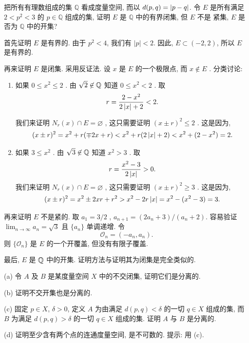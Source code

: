 \documentclass{article}
\begin{document}
\begin{problem}[2-16]
    把所有有理数组成的集 $\mathbb{Q}$ 看成度量空间, 而以 $d(p,q)=\left|p-q\right|$. 令 $E$ 是所有满足
    $2<p^2<3$ 的 $p\in\mathbb{Q}$ 组成的集, 证明 $E$ 是 $\mathbb{Q}$ 中的有界闭集, 但 $E$ 不是
    紧集, $E$ 是否为 $\mathbb{Q}$ 中的开集?
\end{problem}

\begin{solution}
    首先证明 $E$ 是有界的. 由于 $p^2 < 4$, 我们有 $|p| < 2$. 因此, $E \subset (-2, 2)$, 所以 $E$ 是有界的.\par
    再来证明 \( E \) 是闭集. 采用反证法. 设 \( x \) 是 \( E \) 的一个极限点, 而 \( x\not\in E \) . 分类讨论:
    \begin{enumerate}[label=(\alph*)]
        \item 如果 \( 0\le x^2\le 2 \) . 由 \( \sqrt{2}\not\in\mathbb{Q} \) 知道 \( 0\le x^2<2 \) . 取
        \[ r=\frac{2-x^2}{2\left|x\right|+2}<2. \] \par
        我们来证明 \( N_r(x)\cap E=\varnothing \) , 这只需要证明 \( (x\pm r)^2\le 2 \) . 这是因为, 
        \[ (x\pm r)^2=x^2+r(\mp2x+r)<x^2+r(2\left|x\right|+2)<x^2+(2-x^2)=2. \] 
        \item 如果 \( 3\le x^2 \) . 由 \( \sqrt{3}\not\in\mathbb{Q} \) 知道 \( x^2>3 \) . 取
        \[ r=\frac{x^2-3}{2\left|x\right|}>0. \] 
        我们来证明 \( N_r(x)\cap E=\varnothing \) , 这只需要证明 \( (x\pm r)^2\ge 3 \) . 这是因为,
        \[ (x\pm r)^2=x^2\pm 2xr+r^2>x^2-2r\left|x\right|=x^2-(x^2-3)=3. \] 
    \end{enumerate}\par
    再来证明 \( E \) 不是紧的. 取 \( a_1=3/2 \) , \( a_{n+1}=(2a_n+3)/(a_n+2) \). 容易验证 \( \lim_{n\to\infty}a_n=\sqrt{3} \) 且 \( \{a_n\} \) 单调递增. 令
    \[ \mathcal{O}_n=(-a_n,a_n). \] 
    则 \( \{\mathcal{O}_n\} \) 是 \( E \) 的一个开覆盖, 但没有有限子覆盖.\par
    最后, \( E \) 是 \( \mathbb{Q} \) 中的开集. 证明方法与证明其为闭集是完全类似的.
\end{solution}

\begin{problem}[2-19]
    (a) 令 $A$ 及 $B$ 是某度量空间 $X$ 中的不交闭集, 证明它们是分离的.

    (b) 证明不交开集也是分离的.

    (c) 固定 $p\in X$, $\delta>0$, 定义 $A$ 为由满足 $d(p,q)<\delta$ 的一切 $q\in X$ 组成的集,
    而 $B$ 为满足 $d(p,q)>\delta$ 的一切 $q\in X$ 组成的集. 证明 $A$ 与 $B$ 是分离的.

    (d) 证明至少含有两个点的连通度量空间, 是不可数的. 提示: 用 (c).
\end{problem}
\end{document}
